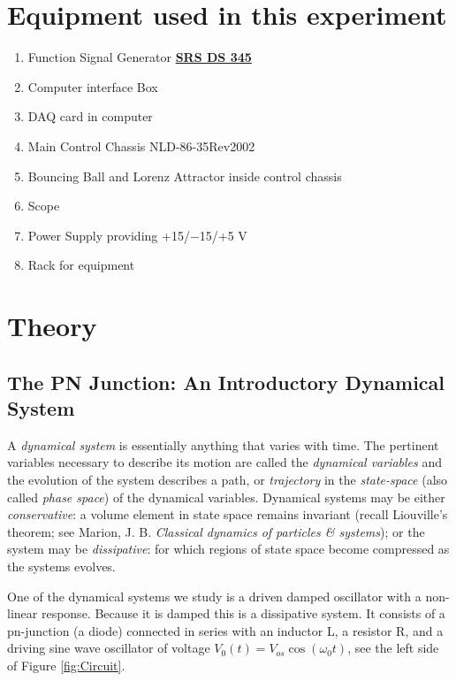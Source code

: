 \documentclass{../lab}
\begin{document}
\section{Equipment used in this experiment}

\begin{enumerate}
    \item Function Signal Generator \href{https://youtu.be/PrM8DHFOFS0}{\textbf{SRS DS 345}}

    \item Computer interface Box

    \item DAQ card in computer

    \item Main Control Chassis NLD-86-35Rev2002

    \item Bouncing Ball and Lorenz Attractor inside control chassis

    \item Scope

    \item Power Supply providing +15/$-$15/+5 V

    \item Rack for equipment
\end{enumerate}

\section{Theory}

\subsection{The PN Junction: An Introductory Dynamical System}

A \emph{dynamical system} is essentially anything that varies with time. The pertinent variables necessary to describe its motion are called the \emph{dynamical variables} and the evolution of the system describes a path, or \emph{trajectory} in the \emph{state-space} (also called \emph{phase space}) of the dynamical variables. Dynamical systems may be either \emph{conservative}: a volume element in state space remains invariant (recall Liouville's theorem; see Marion, J. B. \emph{Classical dynamics of particles \& systems}); or the system may be \emph{dissipative}: for which regions of state space become compressed as the systems evolves.

One of the dynamical systems we study is a driven damped oscillator with a non-linear response. Because it is damped this is a dissipative system. It consists of a pn-junction (a diode) connected in series with an inductor L, a resistor R, and a driving sine wave oscillator of voltage $V_0(t) = V_{os} \cos(\omega_0 t) $, see the left side of Figure \ref{fig:Circuit}.
\end{document}

